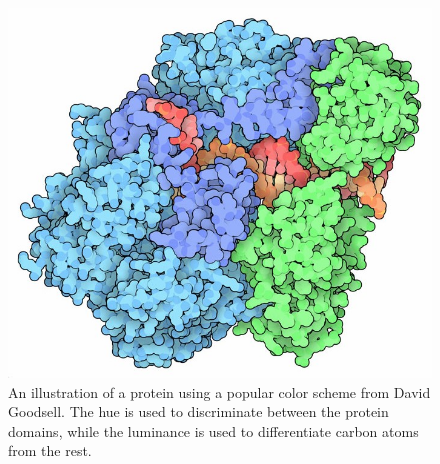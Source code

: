\documentclass[review,journal]{vgtc}         %
\begin{document}
%	
	
	\begin{figure}
		
\centering
\includegraphics[width=0.5\linewidth]{Figures/goodsell_protein}
\caption{An illustration of a protein using a popular color scheme from David Goodsell. The hue is used to discriminate between the protein domains, while the luminance is used to differentiate carbon atoms from the rest.}
\label{fig:goodsell_protein}
\end{figure}
\end{document}
